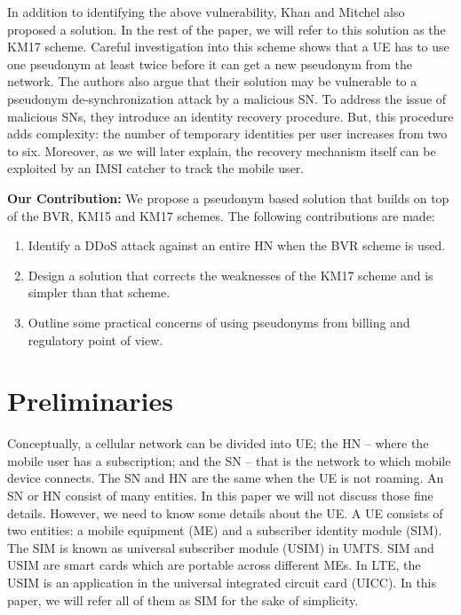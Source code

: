 \documentclass{llncs} %
\begin{document}
In addition to identifying the above vulnerability, Khan and Mitchel \cite{wisec17} also proposed a solution. In the rest of the paper, we will refer to this solution as the KM17 scheme. Careful investigation into this scheme shows that a UE has to use one pseudonym at least twice before it can get a new pseudonym from the network. The authors also argue that their solution may be vulnerable to a pseudonym de-synchronization attack by a malicious SN. To address the issue of malicious SNs, they introduce an identity recovery procedure. But, this procedure adds complexity: the number of temporary identities per user increases from two to six. Moreover, as we will later explain, the recovery mechanism itself can be exploited by an IMSI catcher to track the mobile user.


\textbf{Our Contribution:}
We propose a pseudonym based solution that builds on top of the BVR, KM15 and KM17 schemes. The following contributions are made:
\begin{enumerate}
\item Identify a DDoS attack against an entire HN when the BVR scheme is used.
\item Design a solution that corrects the weaknesses of the KM17 scheme and is simpler than that scheme.
\item Outline some practical concerns of using pseudonyms from billing and regulatory point of view.
\end{enumerate}




\section{Preliminaries}
Conceptually, a cellular network can be divided into UE; the HN -- where the mobile user has a subscription; and the SN -- that is the network to which mobile device connects.  The SN and HN are the same when the UE is not roaming. An SN or HN consist of many entities. In this paper we will not discuss those fine details. However, we need to know some details about the UE. A UE consists of two entities: a mobile equipment (ME) and a subscriber identity module (SIM). The SIM is known as universal subscriber module (USIM) in UMTS. SIM and USIM are smart cards which are portable across different MEs. In LTE, the USIM is an application in the universal integrated circuit card (UICC). In this paper, we will refer all of them as SIM for the sake of simplicity.
\end{document}
